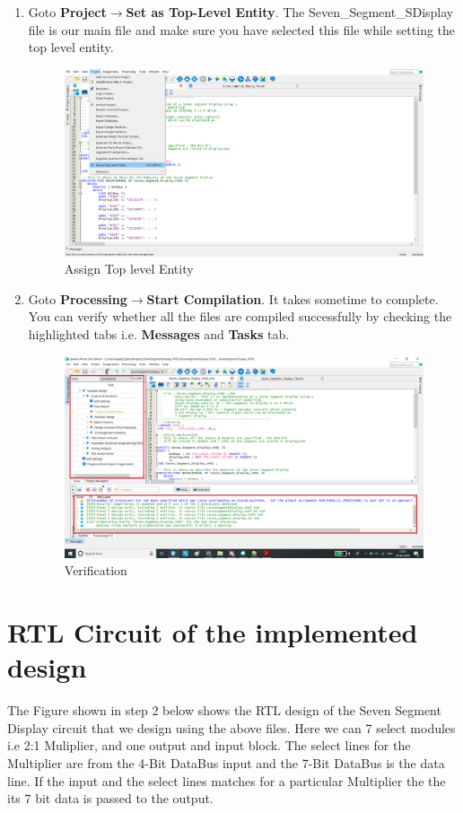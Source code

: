 \documentclass[12pt,singleside,a4paper]{article}
\begin{document}
\begin{enumerate}
    \item Goto \textbf{Project}$\rightarrow$\textbf{Set as Top-Level Entity}. The Seven\_Segment\_SDisplay file is our main file and make sure you have selected this file while setting the top level entity.
    \begin{figure}[H]
    \centering
    \includegraphics[width=14cm,keepaspectratio]{Project/Create4.png}
    \caption{Assign Top level Entity}
    \end{figure}
    \newpage
    \item Goto \textbf{Processing}$\rightarrow$\textbf{Start Compilation}. It takes sometime to complete. You can verify whether all the files are compiled successfully by checking the highlighted tabs i.e. \textbf{Messages} and \textbf{Tasks} tab.
    \begin{figure}[H]
    \centering
    \includegraphics[width=12cm,keepaspectratio]{Project/Create5.png}
    \caption{Verification }
    \end{figure}
    
\end{enumerate}

\section{RTL Circuit of the implemented design}
The Figure shown in step 2 below shows the RTL design of the Seven Segment Display  circuit that we design using the above files. Here we can 7 select modules i.e 2:1 Muliplier, and one output and input block. The select lines for the Multiplier are from the 4-Bit DataBus input and the 7-Bit DataBus is the data line. If the input and the select lines matches for a particular Multiplier the the its 7 bit data is passed to the output.  
\end{document}
